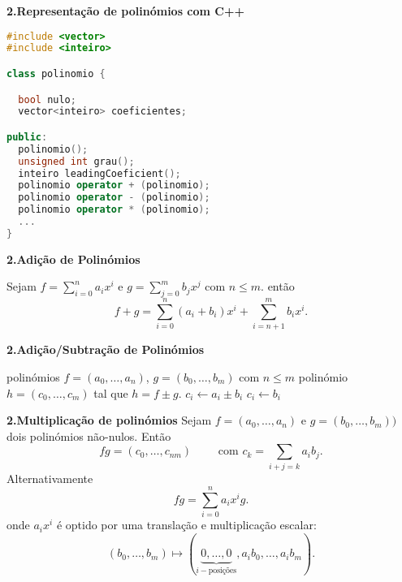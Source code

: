 \documentclass[handout]{beamer}
\begin{document}
\begin{frame}[fragile]{\bf 2.}{\bf Representação de polinómios com C++}

\begin{lstlisting}[language=C++]
#include <vector>
#include <inteiro>

class polinomio {

  bool nulo;
  vector<inteiro> coeficientes;

public:
  polinomio();
  unsigned int grau();
  inteiro leadingCoeficient();
  polinomio operator + (polinomio);
  polinomio operator - (polinomio);
  polinomio operator * (polinomio);
  ...
}

\end{lstlisting}
\end{frame}


\begin{frame}{\bf 2.}{\bf Adição de Polinómios}

Sejam $f=\sum_{i=0}^n a_i x^i$ e $g=\sum_{j=0}^m b_j x^j$ com $n\leq m$. então 
$$f+g = \sum_{i=0}^n (a_i+b_i) x^i  + \sum_{i=n+1}^m b_i x^i .$$
\end{frame}




\begin{frame}[fragile]{\bf 2.}{\bf Adição/Subtração de Polinómios}
\begin{algorithmic}
\REQUIRE polinómios $f=(a_0,\ldots, a_n)$, $g=(b_0,\ldots, b_m)$ com $n\leq m$
\ENSURE polinómio $h=(c_0, \ldots, c_m)$ tal que $h=f\pm g$.
  \STATE $c_i \leftarrow a_i\pm b_i$
\ENDFOR
{}
  \STATE $c_i \leftarrow b_i$
\ENDFOR
\end{algorithmic}

\end{frame}




\begin{frame}{\bf 2.}{\bf Multiplicação de polinómios}
Sejam $f=(a_0,\ldots, a_n)$ e $g=(b_0,\ldots, b_m))$ dois polinómios não-nulos.
Então
$$ fg = (c_0, \ldots, c_{nm}) \qquad \mbox{ com } c_k=\sum_{i+j=k}a_i b_j .$$
\pause Alternativamente 
$$ fg = \sum_{i=0}^n a_ix^ig.$$
onde $a_ix^i$ é optido por uma translação e multiplicação escalar: 
$$(b_0,\ldots, b_m) \mapsto (\underbrace{0,\ldots, 0}_{i-\mbox{posições}},a_ib_0,\ldots, a_ib_m).$$
\end{frame}
\end{document}
